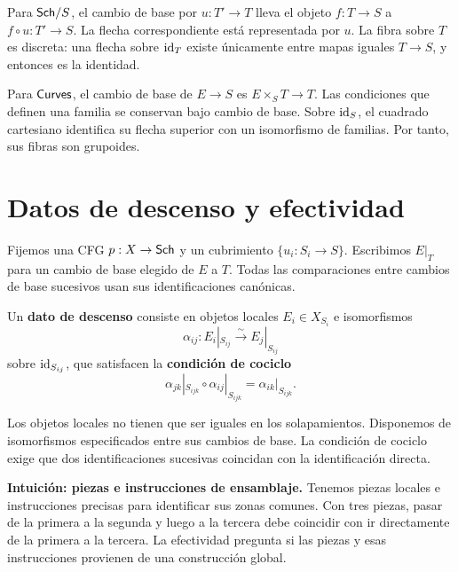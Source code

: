 \documentclass[12pt,openany]{memoir}
\begin{document}
\begin{Ex}
Para \(\mathsf{Sch}/S\), el cambio de base por \(u:T'\to T\) lleva el objeto
\(f:T\to S\) a \(f\circ u:T'\to S\). La flecha correspondiente está
representada por \(u\). La fibra sobre \(T\) es discreta: una flecha sobre
\(\operatorname{id}_T\) existe únicamente entre mapas iguales \(T\to S\), y entonces
es la identidad.

Para \(\mathsf{Curves}\), el cambio de base de \(E\to S\) es
\(E\times_S T\to T\). Las condiciones que definen una familia se
conservan bajo cambio de base. Sobre \(\operatorname{id}_S\), el cuadrado cartesiano
identifica su flecha superior con un isomorfismo de familias. Por tanto,
sus fibras son grupoides.
\end{Ex}

\section{Datos de descenso y efectividad}
\label{sec:descent}

Fijemos una CFG \(p:X\to\mathsf{Sch}\) y un cubrimiento
\(\{u_i:S_i\to S\}\). Escribimos \(E|_T\) para un cambio de base
elegido de \(E\) a \(T\). Todas las comparaciones entre cambios de base
sucesivos usan sus identificaciones canónicas.

\begin{Def}
Un \textbf{dato de descenso} consiste en objetos locales
\(E_i\in X_{S_i}\) e isomorfismos
\[
 \alpha_{ij}:E_i|_{S_{ij}}\xrightarrow{\sim}E_j|_{S_{ij}}
\]
sobre \(\operatorname{id}_{S_{ij}}\), que satisfacen la \textbf{condición de cociclo}
\[
 \alpha_{jk}|_{S_{ijk}}\circ\alpha_{ij}|_{S_{ijk}}
   =\alpha_{ik}|_{S_{ijk}}.
\]
\end{Def}

\begin{ptcb}
Los objetos locales no tienen que ser iguales en los solapamientos.
Disponemos de isomorfismos especificados entre sus cambios de base.
La condición de cociclo exige que dos identificaciones sucesivas coincidan
con la identificación directa.
\end{ptcb}

\begin{ptcb}
\textbf{Intuición: piezas e instrucciones de ensamblaje.}
Tenemos piezas locales e instrucciones precisas para identificar sus zonas
comunes. Con tres piezas, pasar de la primera a la segunda y luego a la
tercera debe coincidir con ir directamente de la primera a la tercera.
La efectividad pregunta si las piezas y esas instrucciones provienen de
una construcción global.
\end{ptcb}
\end{document}
